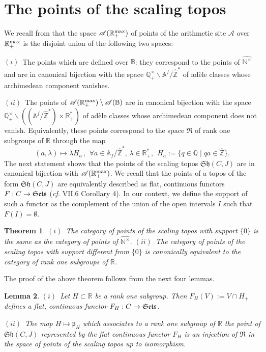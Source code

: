 \documentclass{elsart3-1}
\newtheorem{theorem}{Theorem}[section]
\newtheorem{lemma}[theorem]{Lemma}
\def\A{{\mathbb A}}
\def\B{{\mathbb B}}
\def\N{{\mathbb N}}
\def\Q{{\mathbb Q}}
\def\R{{\mathbb R}}
\def\Z{{\mathbb Z}}
\def\aarith{{\mathscr A}}
\def\qqq{\,,\,~\forall}
\newcommand{\cf}{{\it cf.}}
\def\ffp{\mathfrak{p}}
\def\rmax{\R_+^{\rm max}}
\def\Se{\frak{ Sets}}
\def\sh{\mathfrak{Sh}}
\def\wnt{{\widehat{\N^{\times}}}}
\def\vsp{\vspace{.05in}}
\begin{document}
\section{The points of the scaling topos} 
\vspace*{-.3cm}

We recall from \cite{CC1} that the space $\aarith(\rmax)$ of points of the arithmetic site $\aarith$ over $\rmax$  is the disjoint union of the following two spaces:

$(i)$~The points which are defined over $\B$:  they correspond to the  points of $\wnt$ and are in canonical bijection with the space $
\Q_+^\times\backslash\A^f/\hat\Z^*
$  of  ad\`ele classes whose archimedean component vanishes.

$(ii)$~The points of $\aarith(\rmax)\setminus \aarith(\B)$  are in canonical bijection with the space $\Q_+^\times\backslash\left(( \A^f/\hat\Z^*)\times \R_+^*\right)$ of  ad\`ele classes whose archimedean component does not vanish. Equivalently, these points correspond to the space $\mathfrak R $ of  rank one subgroups  of $\R$ through the map 
$$
(a,\lambda) \mapsto  \lambda H_a\qqq a\in \A_f/\hat\Z^*, \, \lambda \in  \R_+^*, \  \  H_a:=\{q\in\Q\mid qa\in \hat\Z \}.
$$
The next statement shows that the points of the scaling topos $\sh(C,J)$ are in canonical bijection with $\aarith(\rmax)$. We recall that the points of a topos of the form $\sh(C,J)$ are equivalently described as flat, continuous functors $F:C\to \Se$ (\cf \cite{MM} VII.6 Corollary 4). In our context, we define the support of such a functor as the complement of the union of the open intervals $I$ such that $F(I)=\emptyset$.
\vsp
\begin{theorem}\label{thmpointsrnt}
$(i)$~The category of points of the scaling topos  with support $\{0\}$ is the same as the category of points of $\wnt$.\newline
$(ii)$~The category of points of the scaling topos  with  support different from $\{0\}$ is canonically equivalent to the category of rank one subgroups of $\R$.



\end{theorem}
\vsp
The proof of the above theorem follows from the next four lemmas.
\vsp
\begin{lemma} \label{doublelem1} 
$(i)$~Let $H\subset \R$ be a rank one subgroup. Then  $F_H(V):=V\cap H_+$ defines a flat, continuous functor $F_H:C\to \Se$.

$(ii)$~The map $H\mapsto \ffp_H$ which associates to a rank one subgroup of $\R$ the point of $\sh(C,J)$ represented by the flat continuous functor $F_H$ is an injection of $\mathfrak R $ in the space of points of the scaling topos  up to isomorphism.
\end{lemma}
\end{document}
